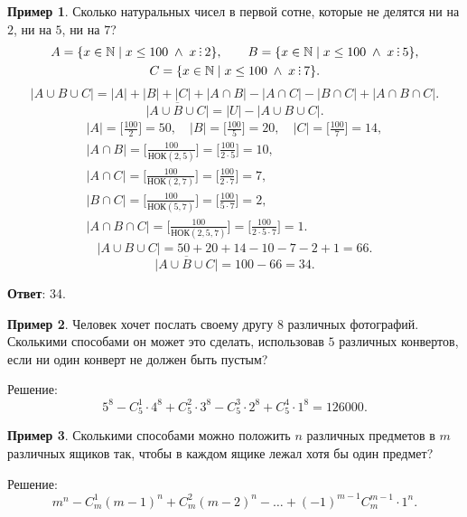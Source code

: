\documentclass[a5paper, 11pt]{extarticle}
\theoremstyle{definition}
\newtheorem{example}{Пример}[subsection]
\theoremstyle{definition}
\theoremstyle{definition}
\numberwithin{figure}{section}
\numberwithin{table}{section}
\newcommand*{\divby}{\mathrel{\rotatebox{90}{$\hskip-1pt.{}.{}.$}}}%
\renewcommand*{\nok}{\text{НОК}}
\begin{document}
\begin{example}
    Сколько натуральных чисел в первой сотне, которые не делятся ни на \(2\), ни на \(5\), ни на \(7\)?
    \begin{gather*}
        A = \{ x \in \mathbb{N} \mid x \leq 100 \; \land \; x \divby 2 \},
        \qquad
        B = \{ x \in \mathbb{N} \mid x \leq 100 \; \land \; x \divby 5 \},
        \\
        C = \{ x \in \mathbb{N} \mid x \leq 100 \; \land \; x \divby 7 \}.
    \end{gather*}
    \[
        |A \cup B \cup C| = |A| + |B| + |C| + |A \cap B| - |A \cap C| - |B \cap C| + |A \cap B \cap C|.
    \]
    \[
        \overline{|A \cup B \cup C|} = |U| - |A \cup B \cup C|.
    \]
    \begin{gather*}
        |A| = \Bigg[ \frac{100}{2} \Bigg] = 50,
        \quad
        |B| = \Bigg[ \frac{100}{5} \Bigg] = 20,
        \quad
        |C| = \Bigg[ \frac{100}{7} \Bigg] = 14,
        \\
        |A \cap B| = \Bigg[ \frac{100}{\nok(2, 5)} \Bigg] = \Bigg[ \frac{100}{2 \cdot 5} \Bigg] = 10, \\
        |A \cap C| = \Bigg[ \frac{100}{\nok(2, 7)} \Bigg] = \Bigg[ \frac{100}{2 \cdot 7} \Bigg] = 7, \\
        |B \cap C| = \Bigg[ \frac{100}{\nok(5, 7)} \Bigg] = \Bigg[ \frac{100}{5 \cdot 7} \Bigg] = 2, \\
        |A \cap B \cap C| = \Bigg[ \frac{100}{\nok(2, 5, 7)} \Bigg] = \Bigg[ \frac{100}{2 \cdot 5 \cdot 7} \Bigg] = 1.
    \end{gather*}
    \[
        |A \cup B \cup C| = 50 + 20 + 14 - 10 - 7 - 2 + 1 = 66.
    \]
    \[
        \overline{|A \cup B \cup C|} = 100 - 66 = 34.
    \]

    \textbf{Ответ}: 34.
\end{example}

\begin{example}
    Человек хочет послать своему другу \(8\) различных фотографий. Сколькими способами он может это сделать, использовав \(5\) различных конвертов, если ни один конверт не должен быть пустым?

    Решение:
    \[
        5^8 - C_5^1 \cdot 4^8 + C_5^2 \cdot 3^8 - C_5^3 \cdot 2^8 + C_5^4 \cdot 1^8 = 126000.
    \]
\end{example}

\begin{example}
    Сколькими способами можно положить \(n\) различных предметов в \(m\) различных ящиков так, чтобы в каждом ящике лежал хотя бы один предмет?

    Решение:
    \[
        m^n - C_m^1 (m - 1)^n + C_m^2 (m - 2)^n - \ldots + (-1)^{m - 1} C_m^{m - 1} \cdot 1^n.
    \]
\end{example}
\end{document}

